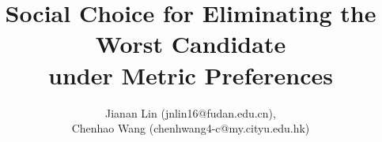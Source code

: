 \documentclass[11pt]{article}
\theoremstyle{remark}
\begin{document}
\newenvironment{mylabel}
{
\begin{list}{(\roman{my})}{
\setlength{\parsep}{-1mm}
\setlength{\labelwidth}{8mm}
\usecounter{my}}
}{\end{list}}

\newenvironment{mylabel2}
{
\begin{list}{(\alph{my2})}{
\setlength{\parsep}{-0mm} \setlength{\labelwidth}{8mm}
\setlength{\leftmargin}{3mm}
\usecounter{my2}}
}{\end{list}}

\newenvironment{mylabel3}
{
\begin{list}{(\alph{my3})}{
\setlength{\parsep}{-1mm}
\setlength{\labelwidth}{8mm}
\setlength{\leftmargin}{10mm}
\usecounter{my3}}
}{\end{list}}

\title{Social Choice for Eliminating the Worst Candidate\\ under Metric Preferences}

\vspace{-6em}

\maketitle

\vspace{-3em}

\begin{center}\large

\author{Jianan Lin (jnlin16@fudan.edu.cn),\\ Chenhao Wang (chenhwang4-c@my.cityu.edu.hk)}

\end{center}

\vspace{2em}

\end{document}
